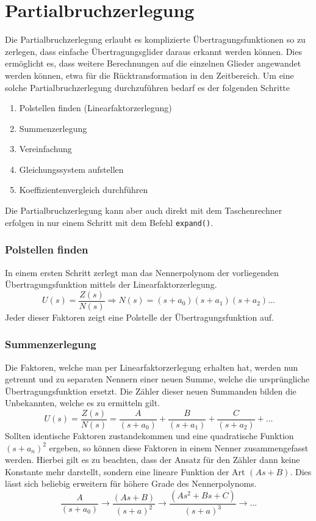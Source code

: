 \section{Partialbruchzerlegung}
Die Partialbruchzerlegung erlaubt es komplizierte Übertragungsfunktionen
so zu zerlegen, dass einfache Übertragungsglider daraus erkannt werden 
können. Dies ermöglicht es, dass weitere Berechnungen auf die einzelnen
Glieder angewandet werden können, etwa für die Rücktransformation in 
den Zeitbereich. Um eine solche Partialbruchzerlegung durchzuführen 
bedarf es der folgenden Schritte
%
\begin{enumerate}
    \item Polstellen finden (Linearfaktorzerlegung)
    \item Summenzerlegung
    \item Vereinfachung
    \item Gleichungssystem aufstellen
    \item Koeffizientenvergleich durchführen
\end{enumerate}
%
Die Partialbruchzerlegung kann aber auch direkt mit dem Taschenrechner
erfolgen in nur einem Schritt mit dem Befehl \verb?expand()?.

\subsubsection{Polstellen finden}
In einem ersten Schritt zerlegt man das Nennerpolynom der vorliegenden 
Übertragungsfunktion mittels der Linearfaktorzerlegung.
\[  
    U(s) 
        = \frac{Z(s)}{N(s)} 
        \Rightarrow N(s) 
        = (s+a_0)(s+a_1)(s+a_2) \dots	
\]
Jeder dieser Faktoren zeigt eine Polstelle der Übertragungsfunktion auf.

\subsubsection{Summenzerlegung}
Die Faktoren, welche man per Linearfaktorzerlegung erhalten hat, werden
nun getrennt und zu separaten Nennern einer neuen Summe, welche die
ursprüngliche Übertragungsfunktion ersetzt. Die Zähler dieser neuen
Summanden bilden die Unbekannten, welche es zu ermitteln gilt.
\[  
    U(s) 
        = \frac{Z(s)}{N(s)} 
        = \frac{A}{(s+a_0)} + \frac{B}{(s+a_1)} + \frac{C}{(s+a_2)} + \dots 
\]
Sollten identische Faktoren zustandekommen und eine quadratische 
Funktion $(s+a_n)^2$ ergeben, so können diese Faktoren in einem Nenner
zusammengefasst werden. Hierbei gilt es zu beachten, dass
der Ansatz für den Zähler dann keine Konstante mehr darstellt, sondern 
eine lineare Funktion der Art $(As + B)$. Dies lässt sich beliebig erweitern
für höhere Grade des Nennerpolynoms.
\[  
    \frac{A}{(s+a_0)} 
    \rightarrow \frac{(As + B)}{(s+a)^2}
    \rightarrow \frac{(As^2 + Bs + C)}{(s+a)^3}
    \rightarrow \dots
\]

